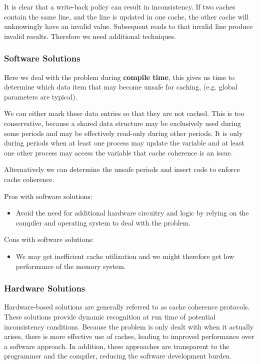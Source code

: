 It is clear that a write-back policy can result in inconsistency. If two caches contain the same line, and the line is updated in one cache, the other cache will unknowingly have an invalid value. Subsequent reads to that invalid line produce invalid results. Therefore we need additional techniques.
\subsubsection{Software Solutions}
Here we deal with the problem during \textbf{compile time}, this gives us time to determine which data item that may become unsafe for caching, (e.g. global parameters are typical).

We can either mark these data entries so that they are not cached. This is too conservative, because a shared data structure may be exclusively used during some periods and may be effectively read-only during other periods. It is only during periods when at least one process may update the variable and at least one other process may access the variable that cache coherence is an issue.

Alternatively we can determine the unsafe periods and insert code to enforce cache coherence.

Pros with software solutions:
\begin{itemize}
\item Avoid the need for additional hardware circuitry and logic by relying on the compiler and operating system to deal with the problem.
\end{itemize}

Cons with software solutions:
\begin{itemize}
\item We may get inefficient cache utilization and we might therefore get low performance of the memory system.
\end{itemize}

\subsubsection{Hardware Solutions}
Hardware-based solutions are generally referred to as cache coherence protocols. These solutions provide dynamic recognition at run time of potential inconsistency conditions. Because the problem is only dealt with when it actually arises, there is more effective use of caches, leading to improved performance over a software approach. In addition, these approaches are transparent to the programmer and the compiler, reducing the software development burden.

